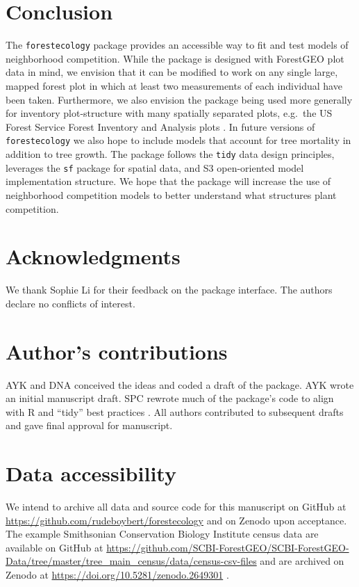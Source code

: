 \documentclass[12pt]{article}
\begin{document}
\hypertarget{conclusion}{%
\section{Conclusion}\label{conclusion}}

The \texttt{forestecology} package provides an accessible way to fit and
test models of neighborhood competition. While the package is designed
with ForestGEO plot data in mind, we envision that it can be modified to
work on any single large, mapped forest plot in which at least two
measurements of each individual have been taken. Furthermore, we also
envision the package being used more generally for inventory
plot-structure with many spatially separated plots, e.g.~the US Forest
Service Forest Inventory and Analysis plots \citep{smith_forest_2002}.
In future versions of \texttt{forestecology} we also hope to include
models that account for tree mortality in addition to tree growth. The
package follows the \texttt{tidy} data design principles, leverages the
\texttt{sf} package for spatial data, and S3 open-oriented model
implementation structure. We hope that the package will increase the use
of neighborhood competition models to better understand what structures
plant competition.

\hypertarget{acknowledgments}{%
\section{Acknowledgments}\label{acknowledgments}}

We thank Sophie Li for their feedback on the package interface. The
authors declare no conflicts of interest.

\hypertarget{authors-contributions}{%
\section{Author's contributions}\label{authors-contributions}}

AYK and DNA conceived the ideas and coded a draft of the package. AYK
wrote an initial manuscript draft. SPC rewrote much of the package's
code to align with R and ``tidy'' best practices
\citep{wickham_welcome_2019}. All authors contributed to subsequent
drafts and gave final approval for manuscript.

\hypertarget{data-accessibility}{%
\section{Data accessibility}\label{data-accessibility}}

We intend to archive all data and source code for this manuscript on
GitHub at \url{https://github.com/rudeboybert/forestecology} and on
Zenodo upon acceptance. The example Smithsonian Conservation Biology
Institute census data are available on GitHub at
\url{https://github.com/SCBI-ForestGEO/SCBI-ForestGEO-Data/tree/master/tree_main_census/data/census-csv-files}
and are archived on Zenodo at
\url{https://doi.org/10.5281/zenodo.2649301}
\citep{gonzalez-akre_scbi-forestgeoscbi-forestgeo-data_2020}.



\end{document}
